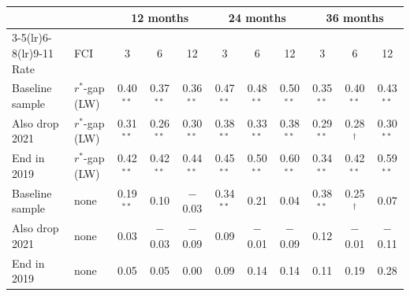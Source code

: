 \begin{tabular}{llccccccccc}
\toprule
 & & \multicolumn{3}{c}{12 months} & \multicolumn{3}{c}{24 months} & \multicolumn{3}{c}{36 months}\\
\cmidrule(lr){3-5}\cmidrule(lr){6-8}\cmidrule(lr){9-11}
Rate & FCI & 3 & 6 & 12 & 3 & 6 & 12 & 3 & 6 & 12 \\
\midrule
Baseline sample & $r^*$-gap (LW) & 0.40$^{**}$ & 0.37$^{**}$ & 0.36$^{**}$ & 0.47$^{**}$ & 0.48$^{**}$ & 0.50$^{**}$ & 0.35$^{**}$ & 0.40$^{**}$ & 0.43$^{**}$ \\
Also drop 2021 & $r^*$-gap (LW) & 0.31$^{**}$ & 0.26$^{**}$ & 0.30$^{**}$ & 0.38$^{**}$ & 0.33$^{**}$ & 0.38$^{**}$ & 0.29$^{**}$ & 0.28$^{\dagger}$ & 0.30$^{**}$ \\
End in 2019 & $r^*$-gap (LW) & 0.42$^{**}$ & 0.42$^{**}$ & 0.44$^{**}$ & 0.45$^{**}$ & 0.50$^{**}$ & 0.60$^{**}$ & 0.34$^{**}$ & 0.42$^{**}$ & 0.59$^{**}$ \\
\midrule
Baseline sample & none & 0.19$^{**}$ & 0.10 & $-$0.03 & 0.34$^{**}$ & 0.21 & 0.04 & 0.38$^{**}$ & 0.25$^{\dagger}$ & 0.07 \\
Also drop 2021 & none & 0.03 & $-$0.03 & $-$0.09 & 0.09 & $-$0.01 & $-$0.09 & 0.12 & $-$0.01 & $-$0.11 \\
End in 2019 & none & 0.05 & 0.05 & 0.00 & 0.09 & 0.14 & 0.14 & 0.11 & 0.19 & 0.28 \\
\bottomrule
\end{tabular}
